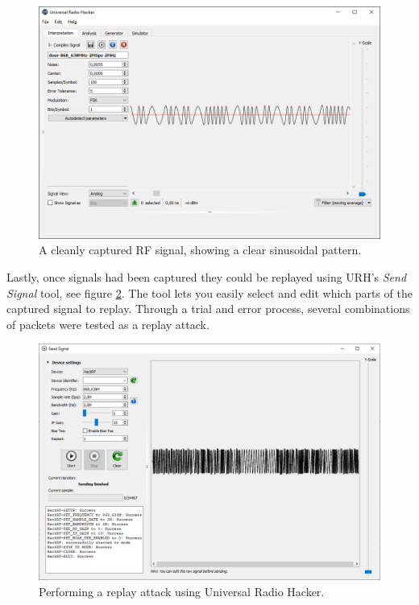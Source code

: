\begin{figure}[!ht]
    \centering
    \includegraphics[width=\textwidth]{images/6-pentesting/zoomed-in-signal.png}
    \caption{A cleanly captured RF signal, showing a clear sinusoidal pattern.}
    \label{fig:zoomed-in-signal}
\end{figure}

Lastly, once signals had been captured they could be replayed using URH's \textit{Send Signal} tool, see figure \ref{fig:uhr-replay-tool}. The tool lets you easily select and edit which parts of the captured signal to replay. Through a trial and error process, several combinations of packets were tested as a replay attack.
\begin{figure}[!ht]
    \centering
    \includegraphics[width=\textwidth]{images/6-pentesting/replay-signal.png}
    \caption{Performing a replay attack using Universal Radio Hacker.}
    \label{fig:uhr-replay-tool}
\end{figure}

